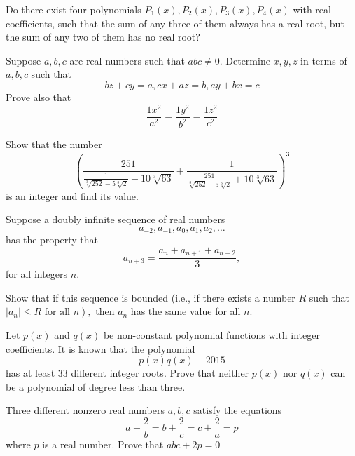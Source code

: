 \documentclass{pset}
\begin{document}
\begin{problems}
\begin{problem}[IrMO 2016 Q3]
    Do there exist four polynomials \(P_{1}(x), P_{2}(x), P_{3}(x), P_{4}(x)\) with real coefficients, such that the sum of any three of them always has a real root, but the sum of any two of them has no real root?
\end{problem}

\begin{problem}[IrMO 2016 Q8]
    Suppose \(a, b, c\) are real numbers such that \(a b c \neq 0 .\) Determine \(x, y, z\) in terms of \(a, b, c\) such that
    $$
    b z+c y=a, c x+a z=b, a y+b x=c
    $$
    Prove also that
    $$
    \frac{1 x^{2}}{a^{2}}=\frac{1 y^{2}}{b^{2}}=\frac{1 z^{2}}{c^{2}}
    $$
\end{problem}

\begin{problem}[IrMO 2016 Q9]
    Show that the number
    $$\left(\frac{251}{\frac{1}{\sqrt[3]{252}-5 \sqrt[3]{2}}-10 \sqrt[3]{63}}+\frac{1}{\frac{251}{\sqrt[3]{252}+5 \sqrt[3]{2}}+10 \sqrt[3]{63}}\right)^{3}$$
    is an integer and find its value.
\end{problem}

\begin{problem}[IrMO 2015 Q5]
    Suppose a doubly infinite sequence of real numbers
    $$
    a_{-2}, a_{-1}, a_{0}, a_{1}, a_{2}, \ldots
    $$
    has the property that 
    $$a_{n+3}=\frac{a_{n}+a_{n+1}+a_{n+2}}{3},$$
    for all integers \(n\).

    Show that if this sequence is bounded (i.e., if there exists a number \(R\) such that \(\left.\left|a_{n}\right| \leq R \text { for all } n\right),\) then \(a_{n}\) has the same value for all \(n .\)
\end{problem}

\begin{problem}[IrMO 2015 Q9]
    Let \(p(x)\) and \(q(x)\) be non-constant polynomial functions with integer coefficients. It is known that the polynomial
    $$
    p(x) q(x)-2015
    $$
    has at least 33 different integer roots. Prove that neither \(p(x)\) nor \(q(x)\) can be a polynomial of degree less than three.
\end{problem}

\begin{problem}[IrMO 2014 Q4]
    Three different nonzero real numbers \(a, b, c\) satisfy the equations
    $$
    a+\frac{2}{b}=b+\frac{2}{c}=c+\frac{2}{a}=p
    $$
    where \(p\) is a real number. Prove that \(a b c+2 p=0\)
\end{problem}



\end{problems}
\end{document}
